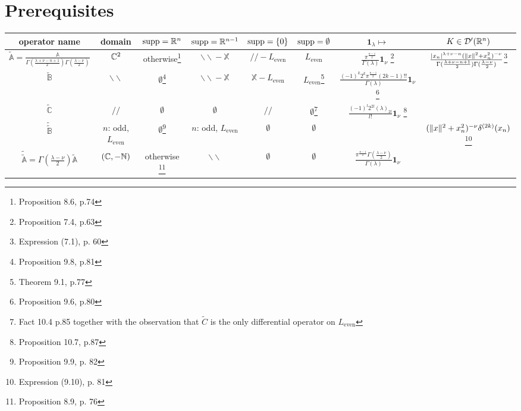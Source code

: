 \documentclass[a4paper,landscape,12pt]{article}
\renewcommand{\setminus}{\ensuremath{{}-{}}}
\newcommand{\Le}{L_{\mbox{even}}}
\newcommand{\on}{\mathbf{1}_\nu}
\begin{document}
\section{Prerequisites}
\begin{adjustwidth}{-4cm}{}
{\scriptsize
\def\arraystretch{3.0}
\begin{tabu}{ |c | c | c | c |c |c |c|c|}
	\hline
		operator name &
		domain &
		$\operatorname{supp}=\mathbb{R}^n$ &
		$\operatorname{supp}=\mathbb{R}^{n-1}$ &
		$\operatorname{supp}=\left\{0\right\}$ &
		$\operatorname{supp}=\emptyset$ &
		$\mathbf{1}_\lambda\mapsto$ &
		$K\in\mathcal{D}'(\mathbb{R}^n)$
	\\\hline
		$\tilde{\mathbb{A}}=\frac{\mathbb{A}}{\Gamma(\frac{\lambda+\nu-n+1}{2})\Gamma(\frac{\lambda-\nu}{2})}$ &
		$\mathbb{C}^2$ &
		otherwise\footnote[1]{Proposition 8.6, p.74} &
		$\backslash\backslash\setminus\mathbb{X}$\footnotemark[1]&
		$//\setminus L_{\mbox{even}}$ \footnotemark[1]& 
		$L_{\mbox{even}}$\footnotemark[1] &
		$\frac{\pi^{\frac{n-1}{2}}}{\Gamma(\lambda)}\on$ \footnote[9]{Proposition 7.4, p.63}&
		$\frac{\left|x_n\right|^{\lambda+\nu-n}(\|x\|^2+x_n^2)^{-\nu}}
			{\Gamma(\frac{\lambda+\nu-n+1}{2})\Gamma(\frac{\lambda-\nu}{2})}$\footnote[10]{Expression (7.1), 
			p. 60}
	\\\hline
		$\tilde{\mathbb{B}}$ &
		$\backslash\backslash$ &
		$\emptyset$\footnote[2]{Proposition 9.8, p.81} &
		$\backslash\backslash\setminus\mathbb{X}$\footnotemark[2] &
		$\mathbb{X}\setminus L_{\mbox{even}}$\footnotemark[2]&
		$L_{\mbox{even}}$\footnote[7]{Theorem 9.1, p.77}&
		$\frac{(-1)^k2^k\pi^{\frac{n-1}{2}}(2k-1)!!}{\Gamma(\lambda)}\on$  \footnote[5]{Proposition 9.6, p.80}&
	\\\hline
		$\tilde{\mathbb{C}}$ &
		$//$ &
		$\emptyset$ &
		$\emptyset$ &
		$//$ &
		$\emptyset$\footnote[3]{Fact
			10.4 p.85 together with the observation that $\tilde{C}$ is the only differential operator on $\Le$}&
		$\frac{(-1)^l2^{2l}(\lambda)_{2l}}{l!}\on$ \footnote[8]{Proposition 10.7, p.87}&

	\\\hline
		$\tilde{\tilde{\mathbb{B}}}$ &
		$n$: odd, $\Le$ &
		$\emptyset$\footnote[4]{Proposition 9.9, p. 82} &
		$n$: odd, $\Le$ \footnotemark[4] &
		$\emptyset$\footnotemark[4] &
		$\emptyset$\footnotemark[4]&
		&
		$(\|x\|^2+x_n^2)^{-\nu}\delta^{(2k)}(x_n)$\footnote[11]{Expression (9.10), p. 81}
	\\\hline
		$\tilde{\tilde{\mathbb{A}}}={\Gamma(\frac{\lambda-\nu}{2})}{\tilde{\mathbb{A}}}$&
		$(\mathbb{C},-\mathbb{N})$ &
		otherwise \footnote[6]{Proposition 8.9, p. 76} &
		$\backslash\backslash$\footnotemark[6]&
		$\emptyset$\footnotemark[6] &
		$\emptyset$\footnotemark[6]&
		$\frac{\pi^{\frac{n-1}{2}}\Gamma(\frac{\lambda-\nu}{2})}{\Gamma(\lambda)}\on$&
\\
		\hline
\end{tabu}
}
\end{adjustwidth}
\end{document}
